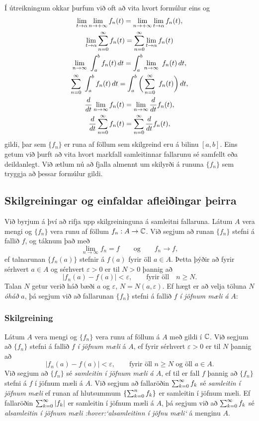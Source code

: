 Í útreikningum okkar  þurfum við oft að  vita
hvort formúlur eins og  
\begin{gather*}
\lim_{t\to \alpha}\lim_{n\to+\infty}f_n(t)=
\lim_{n\to+\infty}\lim_{t\to \alpha}f_n(t),\\
\lim_{t\to \alpha}\sum_{n=0}^\infty f_n(t)=\sum_{n=0}^\infty
\lim_{t\to \alpha}f_n(t)\\
\lim_{n\to\infty}\ \int_a \sp b f_n(t)  \, dt=
\int_a \sp b \lim_{n\to\infty}\
f_n(t) \, dt,\\
\sum_{n=0}^{\infty}\ \int_a \sp b f_n(t)  \, dt=
\int_a \sp b \bigg(\sum_{n=0}^{\infty}\
f_n(t)\bigg) \, dt,\\
\dfrac d{dt} \lim_{n\to \infty} f_n(t) =\lim_{n\to\infty}
\dfrac d{dt} f_n(t),\\
\dfrac d{dt} \sum_{n=0}^{\infty} f_n(t) =\sum_{n=0}^{\infty}
\dfrac d{dt} f_n(t),
\end{gather*}
gildi, þar sem $\{f_n\}$  er runa af föllum sem skilgreind eru á
bilinu $[a,b]$.  Eins getum við þurft að vita hvort markfall
samleitinnar fallarunu sé samfellt eða deildanlegt.  Við ætlum nú að
fjalla almennt um skilyrði á rununa $\{f_n\}$ sem tryggja að þessar
formúlur gildi.

\subsection*{Skilgreiningar og einfaldar
afleiðingar þeirra}

Við byrjum á því að rifja upp skilgreininguna á samleitni fallaruna.
Látum  $A$ vera mengi og $\{ f_n\}$ vera runu af föllum $f_n:A\to
{\mathbb C}$. Við segjum að runan $\{f_n\}$ stefni á fallið $f$, og táknum
það með 
 $$\lim_{n\to\infty}f_n=f \qquad \text{og} \qquad
f_n\to f,
 $$
ef talnarunan $\{f_n(a)\}$ stefnir á $f(a)$ fyrir öll $a\in A$.
Þetta þýðir að fyrir sérhvert $a\in A$ og sérhvert $\varepsilon>0$ er
til $N>0$ þannig að 
 $$|f_n(a)-f(a)|<\varepsilon, \qquad \text{fyrir öll} \quad n\geq N.
 $$
Talan $N$ getur verið háð bæði $a$ og $\varepsilon$,
$N=N(a,\varepsilon)$.  Ef hægt er að velja töluna $N$ 
{\it óháð} $a$, þá segjum við að fallarunan $\{f_n\}$ stefni á
fallið $f$ {\it í jöfnum mæli á } $A$:

\subsubsection{Skilgreining}
Látum $A$ vera mengi og $\{f_n\}$ vera runu af föllum á $A$ með
gildi í ${\mathbb C}$.  Við segjum að $\{f_n\}$ stefni á fallið $f$ {\it í jöfnum
mæli} á $A$, ef fyrir sérhvert $\varepsilon>0$ er til $N$ þannig að
$$|f_n(a)-f(a)|<\varepsilon, \qquad 
\text{fyrir öll $n\geq N$ og öll $a\in A$.}
$$
Við segjum að $\{f_n\}$  sé {\it samleitin í jöfnum mæli á $A$}, 
ef til er fall
$f$ þannig að $\{f_n\}$ stefni á $f$ í jöfnum mæli á $A$.  Við
segjum að fallaröðin $\sum_{k=0}\sp\infty f_k$ sé {\it samleitin í jöfnum
mæli} ef runan af hlutsummum $\{\sum_{k=0}\sp n f_k\}$ er samleitin
í jöfnum mæli.  Ef fallaröðin $\sum_{k=0}\sp\infty |f_k|$
er samleitin í jöfnum mæli á $A$, þá segjum við að
$\sum_{k=0}\sp\infty f_k$  sé {\it alsamleitin í jöfnum
mæli :hover:`alsamleitinn í jöfnu mæli`} á
menginu $A$.


